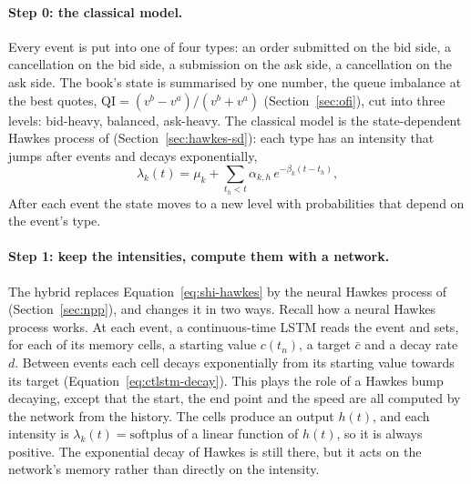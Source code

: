 \paragraph{Step 0: the classical model.} Every event is put into one of four types: an order submitted on the
bid side, a cancellation on the bid side, a submission on the ask side, a cancellation on the ask side. The
book's state is summarised by one number, the queue imbalance at the best quotes,
$\mathrm{QI} = (v^b - v^a)/(v^b + v^a)$ (Section~\ref{sec:ofi}), cut into three levels: bid-heavy, balanced,
ask-heavy. The classical model is the state-dependent Hawkes process of \citet{morariupatrichi2022}
(Section~\ref{sec:hawkes-sd}): each type has an intensity that jumps after events and decays exponentially,
\begin{equation}
\lambda_k(t) = \mu_k + \sum_{t_h < t} \alpha_{k,h}\, e^{-\beta_k (t - t_h)},
\label{eq:shi-hawkes}
\end{equation}
After each event the state moves to a new level with probabilities that depend on the event's type.

\paragraph{Step 1: keep the intensities, compute them with a network.} The hybrid replaces
Equation~\eqref{eq:shi-hawkes} by the neural Hawkes process of \citet{mei2017} (Section~\ref{sec:npp}), and
changes it in two ways. Recall how a neural Hawkes process works. At each event, a continuous-time LSTM
reads the event and sets, for each of its memory cells, a starting value $c(t_n)$, a target $\bar c$ and a
decay rate $d$. Between events each cell decays exponentially from its starting value towards its target
(Equation~\eqref{eq:ctlstm-decay}). This plays the role of a Hawkes bump decaying, except that the start, the end
point and the speed are all computed by the network from the history.
The cells produce an output $h(t)$, and each intensity is $\lambda_k(t) = \mathrm{softplus}$ of a linear
function of $h(t)$, so it is always positive. The exponential decay of Hawkes is still there, but it acts on
the network's memory rather than directly on the intensity.


